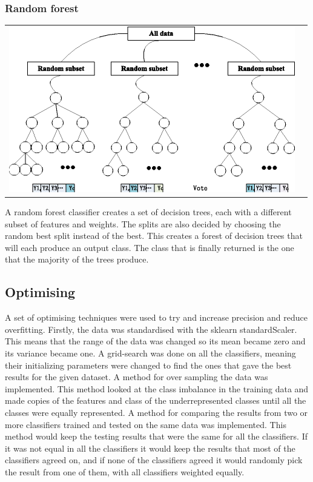\documentclass[12pt]{article}
\begin{document}
\subsubsection{Random forest}
\begin{center}
\begin{tabular}{cc}
\includegraphics[scale = 0.5]{RF.png}
\end{tabular}
\end{center}
A random forest classifier creates a set of decision trees, each with a different subset of features and weights. The splits are also decided by choosing the random best split instead of the best. This creates a forest of decision trees that will each produce an output class. The class that is finally returned is the one that the majority of the trees produce.


\subsection{Optimising}
A set of optimising techniques were used to try and increase precision and reduce overfitting.\newline
 Firstly, the data was standardised with the sklearn standardScaler. This means that the range of the data was changed so its mean became zero and its variance became one.\newline
 A grid-search was done on all the classifiers, meaning their initializing parameters were changed to find the ones that gave the best results for the given dataset.\newline
 A method for over sampling the data was implemented. This method looked at the class imbalance in the training data and made copies of the features and class of the underrepresented classes until all the classes were equally represented.\newline
A method for comparing the results from two or more classifiers trained and tested on the same data was implemented. This method would keep the testing results that were the same for all the classifiers. If it was not equal in all the classifiers it would keep the results that most of the classifiers agreed on, and if none of the classifiers agreed it would randomly pick the result from one of them, with all classifiers weighted equally.
\end{document}
